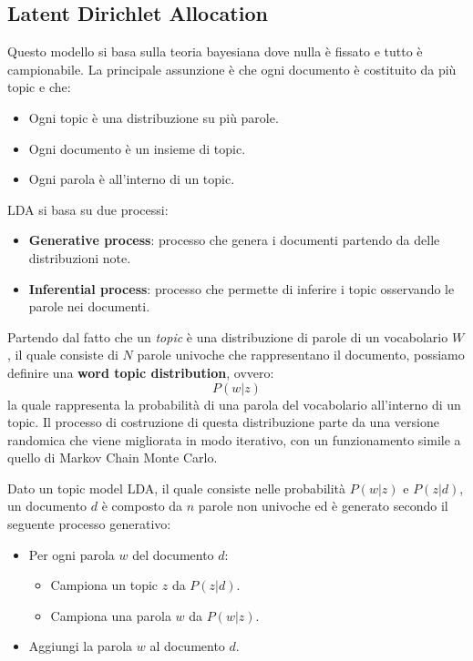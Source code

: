 \subsection{Latent Dirichlet Allocation}
Questo modello si basa sulla teoria bayesiana dove nulla è fissato e tutto è
campionabile. La principale assunzione è che ogni documento è costituito da più
topic e che:
\begin{itemize}
      \item Ogni topic è una distribuzione su più parole.
      \item Ogni documento è un insieme di topic.
      \item Ogni parola è all'interno di un topic.
\end{itemize}
LDA si basa su due processi:
\begin{itemize}
      \item \textbf{Generative process}: processo che genera i documenti partendo
            da delle distribuzioni note.
      \item \textbf{Inferential process}: processo che permette di inferire i topic
            osservando le parole nei documenti.
\end{itemize}
Partendo dal fatto che un \textit{topic} è una distribuzione di parole di un
vocabolario $W$, il quale consiste di $N$ parole univoche che rappresentano il
documento, possiamo definire una \textbf{word topic distribution}, ovvero:
\begin{equation}
      P(w|z)
\end{equation}
la quale rappresenta la probabilità di una parola del vocabolario all'interno di
un topic. Il processo di costruzione di questa distribuzione parte da una versione
randomica che viene migliorata in modo iterativo, con un funzionamento simile a
quello di Markov Chain Monte Carlo.

Dato un topic model LDA, il quale consiste nelle probabilità $P(w|z)$ e $P(z|d)$,
un documento $d$ è composto da $n$ parole non univoche ed è generato secondo il
seguente processo generativo:
\begin{itemize}
      \item Per ogni parola $w$ del documento $d$:
            \begin{itemize}
                  \item Campiona un topic $z$ da $P(z|d)$.
                  \item Campiona una parola $w$ da $P(w|z)$.
            \end{itemize}
      \item Aggiungi la parola $w$ al documento $d$.
\end{itemize}


